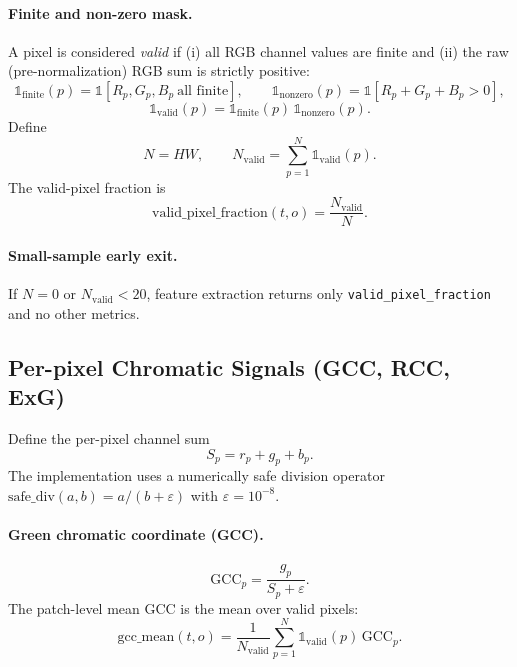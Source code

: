 \paragraph{Finite and non-zero mask.}
A pixel is considered \emph{valid} if (i) all RGB channel values are finite and (ii) the raw (pre-normalization) RGB sum is strictly positive:
\begin{equation}
\mathbb{1}_{\mathrm{finite}}(p) = \mathbb{1}[R_p, G_p, B_p\ \text{all finite}],\qquad
\mathbb{1}_{\mathrm{nonzero}}(p) = \mathbb{1}[R_p+G_p+B_p>0],
\end{equation}
\begin{equation}
\mathbb{1}_{\mathrm{valid}}(p)=\mathbb{1}_{\mathrm{finite}}(p)\,\mathbb{1}_{\mathrm{nonzero}}(p).
\end{equation}
Define
\begin{equation}
N = HW,\qquad N_{\mathrm{valid}}=\sum_{p=1}^{N} \mathbb{1}_{\mathrm{valid}}(p).
\end{equation}
The valid-pixel fraction is
\begin{equation}
\mathrm{valid\_pixel\_fraction}(t,o)=\frac{N_{\mathrm{valid}}}{N}.
\end{equation}

\paragraph{Small-sample early exit.}
If $N=0$ or $N_{\mathrm{valid}}<20$, feature extraction returns only \texttt{valid\_pixel\_fraction} and no other metrics.

\subsection{Per-pixel Chromatic Signals (GCC, RCC, ExG)}

Define the per-pixel channel sum
\begin{equation}
S_p = r_p+g_p+b_p.
\end{equation}
The implementation uses a numerically safe division operator
$\mathrm{safe\_div}(a,b)=a/(b+\varepsilon)$ with $\varepsilon=10^{-8}$.

\paragraph{Green chromatic coordinate (GCC).}
\begin{equation}
\mathrm{GCC}_p = \frac{g_p}{S_p+\varepsilon}.
\end{equation}
The patch-level mean GCC is the mean over valid pixels:
\begin{equation}
\mathrm{gcc\_mean}(t,o) = \frac{1}{N_{\mathrm{valid}}}\sum_{p=1}^{N} \mathbb{1}_{\mathrm{valid}}(p)\,\mathrm{GCC}_p.
\end{equation}

